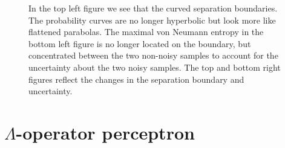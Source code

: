 \begin{figure}[htb!]
    \centering
    \caption{In the top left figure we see that the curved separation boundaries. The probability curves are no longer hyperbolic but look more like flattened parabolas. The maximal von Neumann entropy in the bottom left figure is no longer located on the boundary, but concentrated between the two non-noisy samples to account for the uncertainty about the two noisy samples. The top and bottom right figures reflect the changes in the separation boundary and uncertainty.}
    \label{fig:hx_full_noise}
\end{figure}

\clearpage

\section{ $\Lambda$-operator perceptron}

